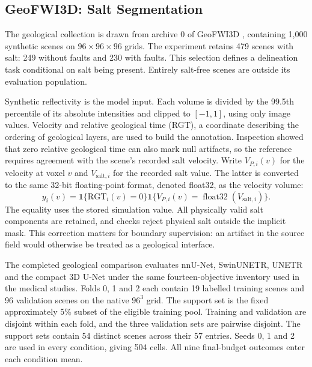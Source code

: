 \documentclass[12pt,a4paper]{article}
\begin{document}
\FloatBarrier
\subsection{GeoFWI3D: Salt Segmentation}
\label{sec:geo-methods}


The geological collection is drawn from archive 0 of GeoFWI3D
\cite{swaminadhan2026geofwi3d}, containing 1,000 synthetic scenes on
$96\times96\times96$ grids. The experiment retains 479 scenes with
salt: 249 without faults and 230 with faults. This selection defines
a delineation task conditional on salt being present. Entirely
salt-free scenes are outside its evaluation population.

Synthetic reflectivity is the model input. Each volume is divided by
the 99.5th percentile of its absolute intensities and clipped to
$[-1,1]$, using only image values. Velocity and relative geological time (RGT), a coordinate describing
the ordering of geological layers, are used to build the annotation. Inspection showed that zero
relative geological time can also mark null artifacts, so the reference
requires agreement with the scene's recorded salt velocity. Write
$V_{P,i}(v)$ for the velocity at voxel $v$ and $V_{\mathrm{salt},i}$
for the recorded salt value. The latter is converted to the same
32-bit floating-point format, denoted float32, as the velocity volume:
\begin{equation}
 y_i(v)=\mathbf{1}\{\mathrm{RGT}_i(v)=0\}
        \mathbf{1}\{V_{P,i}(v)=\operatorname{float32}(V_{\mathrm{salt},i})\}.
\label{eq:geo-reference-construction}
\end{equation}
The equality uses the stored simulation value. All physically valid
salt components are retained, and checks reject physical salt outside
the implicit mask. This correction matters for boundary supervision:
an artifact in the source field would otherwise be treated as a
geological interface.


The completed geological comparison evaluates nnU-Net, SwinUNETR,
UNETR and the compact 3D U-Net under the same fourteen-objective
inventory used in the medical studies. Folds 0, 1 and 2 each contain
19 labelled training scenes and 96 validation scenes on the native
$96^3$ grid. The support set is the fixed approximately 5\% subset
of the eligible training pool. Training and validation are disjoint
within each fold, and the three validation sets are pairwise disjoint.
The support sets contain 54 distinct scenes across their 57 entries.
Seeds 0, 1 and 2 are used in every condition, giving 504 cells.
All nine final-budget outcomes enter each condition mean.
\end{document}
